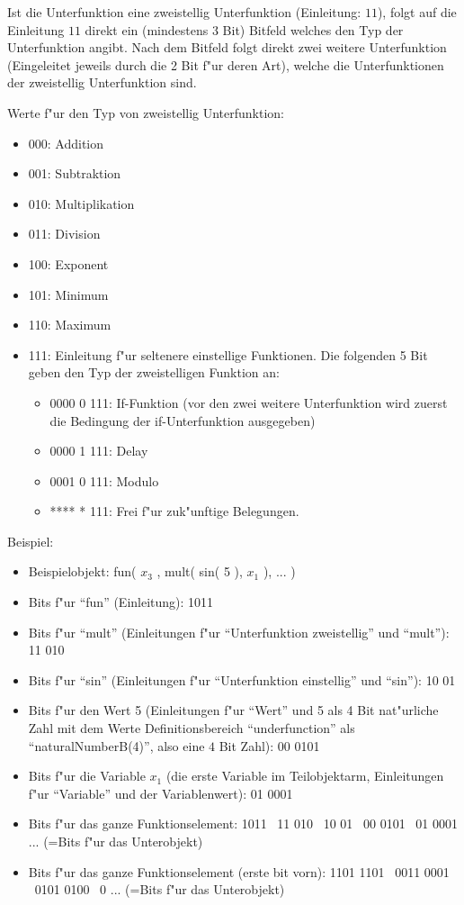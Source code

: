 \bigskip\noindent
Ist die Unterfunktion eine zweistellig Unterfunktion (Einleitung: $11$), folgt auf die Einleitung $11$ direkt ein (mindestens 3 Bit) Bitfeld welches den Typ der Unterfunktion angibt. Nach dem Bitfeld folgt direkt zwei weitere Unterfunktion (Eingeleitet jeweils durch die 2 Bit f"ur deren Art), welche die Unterfunktionen der zweistellig Unterfunktion sind.

\bigskip\noindent
Werte f"ur den Typ von zweistellig Unterfunktion:
\begin{itemize}
 \item 000: Addition
 \item 001: Subtraktion
 \item 010: Multiplikation
 \item 011: Division
 \item 100: Exponent
 \item 101: Minimum
 \item 110: Maximum
 \item 111: Einleitung f"ur seltenere einstellige Funktionen. Die folgenden 5 Bit geben den Typ der zweistelligen Funktion an:
 \begin{itemize}
 \item 0000 0 111: If-Funktion (vor den zwei weitere Unterfunktion wird zuerst die Bedingung der if-Unterfunktion ausgegeben)
 \item 0000 1 111: Delay
 \item 0001 0 111: Modulo
  \item **** * 111: Frei f"ur zuk"unftige Belegungen.
 \end{itemize}
\end{itemize}

\bigskip\noindent
Beispiel:
\begin{itemize}
 \item Beispielobjekt: fun( $x_3$ , mult( sin( 5 ), $x_1$ ), ... )
 \item Bits f"ur ``fun'' (Einleitung): 1011
 \item Bits f"ur ``mult'' (Einleitungen f"ur ``Unterfunktion zweistellig'' und ``mult''): 11 010
 \item Bits f"ur ``sin'' (Einleitungen f"ur ``Unterfunktion einstellig'' und ``sin''): 10 01
 \item Bits f"ur den Wert 5 (Einleitungen f"ur ``Wert'' und 5 als 4 Bit nat"urliche Zahl mit dem Werte Definitionsbereich ``underfunction'' als ``naturalNumberB(4)'', also eine $4$ Bit Zahl): 00 0101
 \item Bits f"ur die Variable $x_1$ (die erste Variable im Teilobjektarm, Einleitungen f"ur ``Variable'' und der Variablenwert): 01 0001
 \item Bits f"ur das ganze Funktionselement: 1011 \ 11 010 \ 10 01 \ 00 0101 \ 01 0001 ... (=Bits f"ur das Unterobjekt)
 \item Bits f"ur das ganze Funktionselement (erste bit vorn): 1101 1101 \ 0011 0001 \ 0101 0100 \ 0 ... (=Bits f"ur das Unterobjekt)
\end{itemize}

